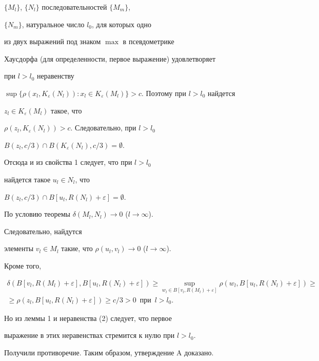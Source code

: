 $\{M_{l}\}$, $\{N_{l}\}$ последовательностей $\{M_{m}\}$, 


$\{N_{m}\}$, натуральное число $l_{0}$, для которых одно


из двух выражений под знаком $\max$ в псевдометрике


Хаусдорфа (для определенности, первое выражение) удовлетворяет


при $l > l_{0}$ неравенству 


$\sup\{\rho(x_{l},K_{\varepsilon }(N_{l})) : x_{l}


\in K_{\varepsilon }(M_{l})\} > c$. Поэтому при $l > l_{0}$ найдется 


$z_{l} \in K_{\varepsilon }(M_{l})$ такое, что 


$\rho(z_{l},K_{\varepsilon }(N_{l})) > c$. Следовательно, при $l > l_{0}$\;


$B(z_{l},c/3) \cap B(K_{\varepsilon }(N_{l}),c/3) = \emptyset$.


Отсюда и из свойства 1 следует, что при $l > l_{0}$ 


найдется такое $u_{l} \in N_{l}$, что


$B(z_{l},c/3) \cap B[u_{l},R(N_{l}) + \varepsilon ] = \emptyset$. 


По условию теоремы $\delta (M_{l},N_{l}) \to 0$ ($l \to \infty $).


Следовательно, найдутся


элементы $v_{l} \in M_{l}$ такие, что $\rho (u_{l},v_{l}) \to 0$ ($l \to \infty $).


Кроме того,


\begin{multline}


\delta (B[v_{l},R(M_{l}) + \varepsilon ],B[u_{l},R(N_{l}) + \varepsilon]) 


\geq \sup\limits_{w_{l} \in B[v_{l},R(M_{l}) + \varepsilon]}


{\rho(w_{l},B[u_{l},R(N_{l}) + \varepsilon])} \geq \\ 


\ge \rho(z_{l},B[u_{l},R(N_{l}) + \varepsilon]) \geq c/3 >0


\ \; \text{при}\ \; l > l_{0}. 


\end{multline}


Но из леммы 1 и неравенства (2) следует, что первое 


выражение в этих неравенствах стремится к нулю при $l > l_{0}$.


Получили противоречие. Таким образом, утверждение A доказано.





